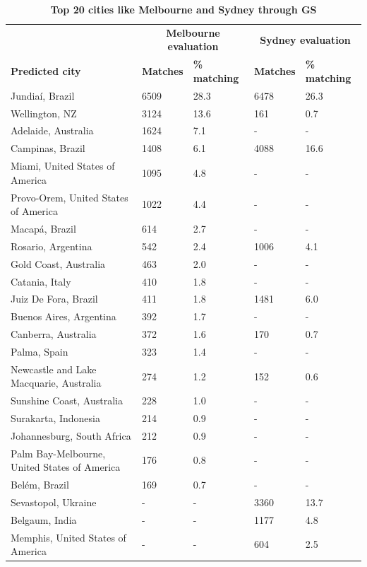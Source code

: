 \documentclass[Crown,sageh,times]{sagej}
\begin{document}
\begin{table}[!htbp]
\caption{\bf Top 20 cities like Melbourne and Sydney through GS \label{tab:melbournesydneyGS}}     
\begin{tabular}{ l  l l l  l}
 \hline    &  \multicolumn{2}{c}{\textbf{Melbourne evaluation}} & \multicolumn{2}{c}{\textbf{Sydney evaluation}}  \\  
\textbf{Predicted city} & \textbf{Matches} & \textbf{\% matching}  & \textbf{Matches} & \textbf{\% matching}\\ \hline
Jundia\'{i}, Brazil & 6509 & 28.3 & 6478 & 26.3 \\ 
Wellington, NZ & 3124 & 13.6 & 161 & 0.7 \\ 
Adelaide, Australia & 1624 & 7.1 &-&- \\ 
Campinas, Brazil & 1408 & 6.1 & 4088 & 16.6 \\ 
Miami, United States of America & 1095 & 4.8 &-&- \\ 
Provo-Orem, United States of America & 1022 & 4.4 &-&- \\ 
Macap\'{a}, Brazil & 614 & 2.7 &-&- \\ 
Rosario, Argentina & 542 & 2.4 & 1006 & 4.1 \\ 
Gold Coast, Australia & 463 & 2.0 &-&- \\ 
Catania, Italy & 410 & 1.8 &-&- \\ 
Juiz De Fora, Brazil & 411 & 1.8 & 1481 & 6.0 \\ 
Buenos Aires, Argentina & 392 & 1.7 &-&- \\ 
Canberra, Australia & 372 & 1.6 & 170 & 0.7 \\ 
Palma, Spain & 323 & 1.4 &-&- \\ 
Newcastle and Lake Macquarie, Australia & 274 & 1.2 & 152 & 0.6 \\ 
Sunshine Coast, Australia & 228 & 1.0 &-&- \\ 
Surakarta, Indonesia & 214 & 0.9 &-&- \\ 
Johannesburg, South Africa & 212 & 0.9 &-&- \\ 
Palm Bay-Melbourne, United States of America & 176 & 0.8 &-&- \\ 
Bel\'{e}m, Brazil & 169 & 0.7 &-&- \\ 
Sevastopol, Ukraine &-&- & 3360 & 13.7\\ 
Belgaum, India &-&- & 1177 & 4.8\\ 
Memphis, United States of America &-&- & 604 & 2.5\\ 

\end{tabular}
\end{table}
\end{document}
